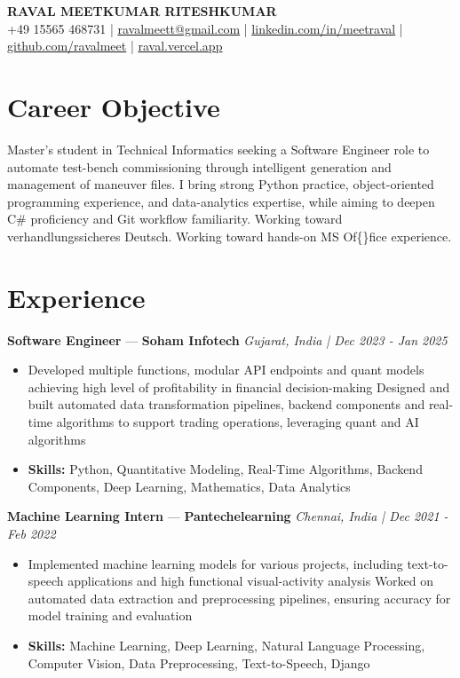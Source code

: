 \documentclass[a4paper,10pt]{article}
\begin{document}
\begin{center}
  {\Large\bfseries RAVAL MEETKUMAR RITESHKUMAR}\\[2pt]
  {\small +49 15565 468731 \;|\; \href{mailto:ravalmeett@gmail.com}{ravalmeett@gmail.com} \;|\; \href{https://www.linkedin.com/in/meetraval/}{linkedin.com/in/meetraval} \;|\; \href{https://github.com/ravalmeet}{github.com/ravalmeet} \;|\; \href{https://raval.vercel.app/}{raval.vercel.app}}
\end{center}
\vspace{-3pt}

\section*{Career Objective}
Master's student in Technical Informatics seeking a Software Engineer role to automate test-bench commissioning through intelligent generation and management of maneuver files. I bring strong Python practice, object-oriented programming experience, and data-analytics expertise, while aiming to deepen C\# proficiency and Git workflow familiarity. Working toward verhandlungssicheres Deutsch. Working toward hands-on MS Of\{\}fice experience.\par

\section*{Experience}
\textbf{Software Engineer} — \textbf{Soham Infotech} \hfill \textit{Gujarat, India \;|\; Dec 2023 - Jan 2025}\par
\vspace{1pt}
\begin{itemize}
  \item Developed multiple functions, modular API endpoints and quant models achieving high level of profitability in financial decision-making Designed and built automated data transformation pipelines, backend components and real-time algorithms to support trading operations, leveraging quant and AI algorithms
  \item \textbf{Skills:} Python, Quantitative Modeling, Real-Time Algorithms, Backend Components, Deep Learning, Mathematics, Data Analytics
\end{itemize}
\vspace{3pt}
\textbf{Machine Learning Intern} — \textbf{Pantechelearning} \hfill \textit{Chennai, India \;|\; Dec 2021 - Feb 2022}\par
\vspace{1pt}
\begin{itemize}
  \item Implemented machine learning models for various projects, including text-to-speech applications and high functional visual-activity analysis Worked on automated data extraction and preprocessing pipelines, ensuring accuracy for model training and evaluation
  \item \textbf{Skills:} Machine Learning, Deep Learning, Natural Language Processing, Computer Vision, Data Preprocessing, Text-to-Speech, Django
\end{itemize}
\end{document}
